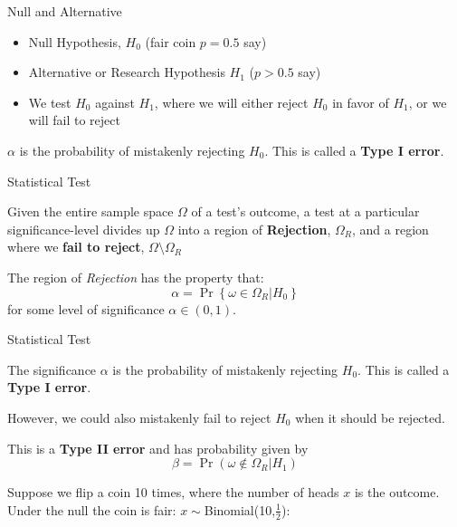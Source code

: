\documentclass{beamer}
\begin{document}
\begin{frame}{Null and Alternative}
\begin{card}
	\begin{itemize}
		\item Null Hypothesis, $H_0$ (fair coin $p=0.5$ say)
		\item Alternative or Research Hypothesis $H_1$ ($p>0.5$ say)\pause
		\item We test $H_0$ against $H_1$, where we will either reject $H_0$ in favor of $H_1$, or we will fail to reject
	\end{itemize}
\end{card}
\begin{card}
$\alpha$ is the probability of mistakenly rejecting $H_0$. This is called a \textbf{Type I error}.
\end{card}
\end{frame}



\begin{frame}{Statistical Test}
\begin{card}
 Given the entire sample space $\Omega$ of a test's outcome, a test at a particular significance-level divides up $\Omega$ into a
region of \textbf{Rejection}, $\Omega_R$, and a region where we \textbf{fail to reject}, $\Omega\setminus\Omega_R$
\end{card}
\begin{card} The region of \emph{Rejection} has the property that:
				$$\alpha=\Pr\left\{\omega\in\Omega_R\left|H_0\right.\right\}$$
			for some level of significance $\alpha\in(0,1)$.
\end{card}
\end{frame}

\begin{frame}{Statistical Test}
\begin{card}
The significance $\alpha$ is the probability of mistakenly rejecting $H_0$. This is called a \textbf{Type I error}.\end{card}
\begin{card}
However, we could also mistakenly fail to reject $H_0$ when it should be rejected. 

This is a \textbf{Type II error} and has probability given by
			$$\beta=\Pr\left(\omega\not\in \Omega_R \left|H_1\right.\right)$$
	\end{card}
\end{frame}

\begin{frame}
\begin{card}
Suppose we flip a coin 10 times, where the number of heads $x$ is the outcome. Under the null the coin is fair: $x\sim$Binomial(10,$\tfrac{1}{2}$):
\end{card}

\begin{center}\end{center}
\end{frame}
\end{document}
